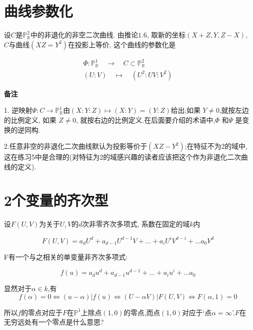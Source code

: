 \documentclass[UTF8]{book}
\begin{document}
	\section{曲线参数化}
		设$ C $是$\mathbb{P}^{2}_{\mathbb{R}}$中的非退化的非空二次曲线. 由推论$ 1.6 $, 取新的坐标$ (X+Z, Y, Z-X) $, $ C $与曲线$(XZ=Y^{2})$在投影上等价, 这个曲线的参数化是
	
		\begin{equation*}
		\begin{array}{l}{\Phi : \mathbb{P}^1_{\mathbb{R}}\quad \longrightarrow \quad C \subset \mathbb{P}^{2}_{\mathbb{R}}} \\ {(U : V) \quad\longmapsto\quad  \left(U^{2} : UV : V^{2}\right)}\end{array}
		\end{equation*}

		\textbf{备注}
		
		
	 	1. 逆映射$\Psi: C\longrightarrow \mathbb{P}^{1}_{\mathbb{R}}$由$(X:Y:Z)\longmapsto(X:Y)=(Y:Z)$给出;如果 $Y \neq 0$,就按左边的比例定义, 如果 $Z \neq 0$, 就按右边的比例定义.在后面要介绍的术语中,$\Phi$ 和$\Psi$ 是变换的逆同构.
	
	
		2.任意非空的非退化二次曲线默认为投影等价于$(XZ-Y^{2})$;在特征不为2的域中,这在练习5中是合理的(对特征为2的域感兴趣的读者应该把这个作为非退化二次曲线的定义).
	\section{2个变量的齐次型}
		设$ F(U, V) $为关于$ U, V $的$ d $次非零齐次多项式, 系数在固定的域$ k $内
		
		\begin{equation*}
		F(U,V)=a_{d}U^{d}+a_{d-1}U^{d-1}V+...+a_{i}U^{i}V^{d-i}+...a_{0}V^{d}
		\end{equation*}
		
		F有一个与之相关的单变量非齐次多项式:
		
		\begin{equation*}
			f(u)=a_{d}u^{d}+a_{d-1}u^{d-1}+...+a_{i}u^{i}+...a_{0}
		\end{equation*}
		
		显然对于$ \alpha \in k $,有
		\begin{equation*}
		f(\alpha )=0 \Leftrightarrow (u-\alpha)|f(u)\Leftrightarrow (U-\alpha V)|F(U,V)\Leftrightarrow F(\alpha,1)=0
		\end{equation*}
		
		所以$ f $的零点对应于$ F $在$\mathbb{P}^{1}$上除点$ (1,0) $的零点,而点$ (1,0) $对应于‘点$\alpha =\infty$’.$ F $在无穷远处有一个零点是什么意思?
		
\end{document}
